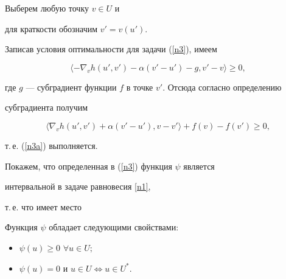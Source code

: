 \begin{pf}


Выберем любую точку $v \in U$  и 


для краткости обозначим $v' = v(u')$. 


Записав условия оптимальности для задачи (\ref{n3}), имеем


$$


\langle -\nabla_v h(u',v') - \alpha (v' - u') - g, v' - v\rangle  \ge 0, 


$$


где $g$ --- субградиент функции $f$ в точке $v'$. Отсюда согласно определению 


субградиента получим


$$


\langle \nabla_v h(u',v') + \alpha (v' - u'), v - v'\rangle  


+ f(v) - f(v') \ge 0,


$$


т.\,е. (\ref{n3a}) выполняется.


\end{pf}





Покажем, что определенная в (\ref{n3}) функция $\psi$ является


интервальной в задаче равновесия \ref{n1},


т.\,е. что имеет место





\begin{props}\label{p14}


Функция $\psi$ обладает следующими свойствами\/${:}$


\begin{itemize}


\item[(i)] $\psi(u) \ge 0$ $\forall u \in U;$


\item[(ii)] $\psi(u) = 0$ и $u \in U \Longleftrightarrow u \in U^*$.


\end{itemize}


\end{props}





